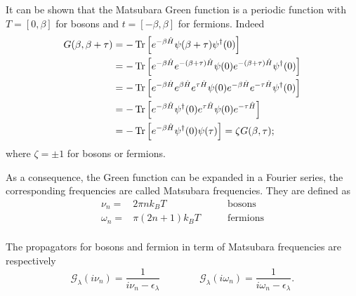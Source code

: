 It can be shown that the Matsubara Green function is a periodic function with $T = [0,\beta]$ for bosons and $t = [-\beta, \beta]$ for fermions. Indeed
\begin{equation}
    \begin{split}
        G(\beta, \beta + \tau) &= -\operatorname{Tr}\left[e^{-\beta\hat H} \psi(\beta + \tau)\psi^\dagger(0) \right] \\
        &= -\operatorname{Tr}\left[e^{-\beta\hat H} e^{-(\beta + \tau)\hat H}\psi(0)e^{-(\beta+ \tau)\hat H}\psi^\dagger(0) \right]\\
        &= -\operatorname{Tr}\left[e^{-\beta\hat H} e^{\beta\hat H}e^{\tau\hat H}\psi(0)e^{-\beta\hat H}e^{-\tau\hat H}\psi^\dagger(0) \right]\\
        &= -\operatorname{Tr}\left[e^{-\beta\hat H}\psi^\dagger(0)e^{\tau\hat H}\psi(0)e^{-\tau\hat H}\right]\\
        &= -\operatorname{Tr}\left[e^{-\beta\hat H}\psi^\dagger(0)\psi(\tau)\right] = \zeta G(\beta,\tau) ;
    \end{split}
\end{equation}
where $\zeta = \pm 1$ for bosons or fermions. 

As a consequence, the Green function can be expanded in a Fourier series, the corresponding frequencies are called Matsubara frequencies. They are defined as 
\begin{equation}
    \begin{aligned}
        \nu_n =& 2\pi nk_BT \qquad &\mathrm{bosons}\\
        \omega_n =& \pi (2n+1)k_BT \qquad &\mathrm{fermions}\\
    \end{aligned}
\end{equation}
 
The propagators for bosons and fermion in term of Matsubara frequencies are respectively
\begin{equation}
    \mathcal{G}_\lambda(i\nu_n)= \frac{1}{i\nu_n - \epsilon_\lambda} \qquad \qquad\mathcal{G}_\lambda(i\omega_n)= \frac{1}{i\omega_n - \epsilon_\lambda}.
\end{equation}